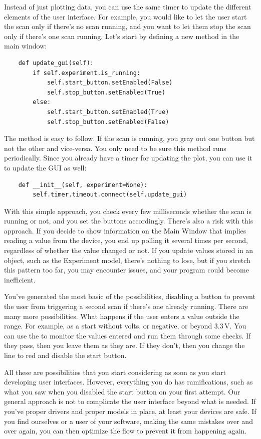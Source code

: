 Instead of just plotting data, you can use the same timer to update the different elements of the user interface. For example, you would like to let the user start the scan only if there's no scan running, and you want to let them stop the scan only if there's one scan running. Let's start by defining a new method in the main window:

\begin{verbatim}
    def update_gui(self):
        if self.experiment.is_running:
            self.start_button.setEnabled(False)
            self.stop_button.setEnabled(True)
        else:
            self.start_button.setEnabled(True)
            self.stop_button.setEnabled(False)
\end{verbatim}

The method  is easy to follow. If the scan is running, you gray out one button but not the other and vice-versa. You only need to be sure this method runs periodically. Since you already have a timer for updating the plot, you can use it to update the GUI as well:

\begin{verbatim}
    def __init__(self, experiment=None):
        self.timer.timeout.connect(self.update_gui)
\end{verbatim}

With this simple approach, you check every few milliseconds whether the scan is running or not, and you set the buttons accordingly. There's also a risk with this approach. If you decide to show information on the Main Window that implies reading a value from the device, you end up polling it several times per second, regardless of whether the value changed or not. If you update values stored in an object, such as the Experiment model, there's nothing to lose, but if you stretch this pattern too far, you may encounter issues, and your program could become inefficient.

You've generated the most basic of the possibilities, disabling a button to prevent the user from triggering a second scan if there's one already running. There are many more possibilities. What happens if the user enters a value outside the range. For example, as a start without volts, or negative, or beyond $3.3\,\textrm{V}$. You can use the  to monitor the values entered and run them through some checks. If they pass, then you leave them as they are. If they don't, then you change the line to red and disable the start button.

All these are possibilities that you start considering as soon as you start developing user interfaces. However, everything you do has ramifications, such as what you saw when you disabled the start button on your first attempt. Our general approach is not to complicate the user interface beyond what is needed. If you've proper drivers and proper models in place, at least your devices are safe. If you find ourselves or a user of your software, making the same mistakes over and over again, you can then optimize the flow to prevent it from happening again.


